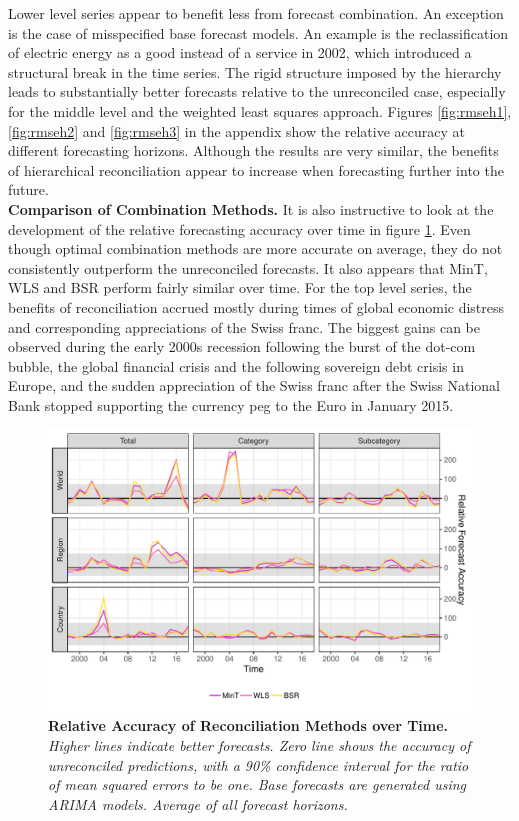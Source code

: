 \documentclass[a4paper,fleqn,11pt]{article}
\begin{document}
Lower level series appear to benefit less from forecast combination. An exception is the case of misspecified base forecast models. An example is the reclassification of electric energy as a good instead of a service in 2002, which introduced a structural break in the time series. The rigid structure imposed by the hierarchy leads to substantially better forecasts relative to the unreconciled case, especially for the middle level and the weighted least squares approach. Figures \ref{fig:rmseh1}, \ref{fig:rmseh2} and \ref{fig:rmseh3} in the appendix show the relative accuracy at different forecasting horizons. Although the results are very similar, the benefits of hierarchical reconciliation appear to increase when forecasting further into the future.\\

\noindent\textbf{Comparison of Combination Methods.} It is also instructive to look at the development of the relative forecasting accuracy over time in figure \ref{fig:rmse_time}. Even though optimal combination methods are more accurate on average, they do not consistently outperform the unreconciled forecasts. It also appears that MinT, WLS and BSR perform fairly similar over time. For the top level series, the benefits of reconciliation accrued mostly during times of global economic distress and corresponding appreciations of the Swiss franc. The biggest gains can be observed during the early 2000s recession following the burst of the dot-com bubble, the global financial crisis and the following sovereign debt crisis in Europe, and the sudden appreciation of the Swiss franc after the Swiss National Bank stopped supporting the currency peg to the Euro in January 2015.\\
\begin{figure}[H]
	\includegraphics[width=\textwidth]{fig/fig_eval_rmse_time}
	\caption[Relative Accuracy of Reconciliation Methods over Time]{\textbf{Relative Accuracy of Reconciliation Methods over Time.} \textit{Higher lines indicate better forecasts. Zero line shows the accuracy of unreconciled predictions, with a 90\% confidence interval for the ratio of mean squared errors to be one. Base forecasts are generated using ARIMA models. Average of all forecast horizons.}} \label{fig:rmse_time}
\end{figure}
\end{document}
